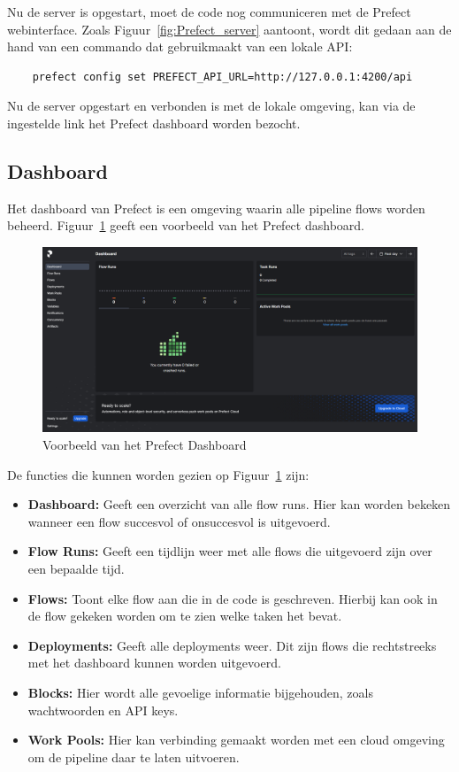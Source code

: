 Nu de server is opgestart, moet de code nog communiceren met de Prefect webinterface. Zoals Figuur~\ref{fig:Prefect_server} aantoont, wordt dit gedaan aan de hand van een commando dat gebruikmaakt van een lokale API:

\begin{verbatim}
    prefect config set PREFECT_API_URL=http://127.0.0.1:4200/api
\end{verbatim}

Nu de server opgestart en verbonden is met de lokale omgeving, kan via de ingestelde link het Prefect dashboard worden bezocht.

\subsection{Dashboard}

Het dashboard van Prefect is een omgeving waarin alle pipeline flows worden beheerd. Figuur~\ref{fig:Prefect_Dashboard} geeft een voorbeeld van het Prefect dashboard.

\begin{figure}[h]
    \centering
    \includegraphics[width=0.9\linewidth]{graphics/Prefect_dashboard.PNG}
    \caption{Voorbeeld van het Prefect Dashboard}
    \label{fig:Prefect_Dashboard}
\end{figure}

De functies die kunnen worden gezien op Figuur~\ref{fig:Prefect_Dashboard} zijn:

\begin{itemize}
    \item \textbf{Dashboard:} Geeft een overzicht van alle flow runs. Hier kan worden bekeken wanneer een flow succesvol of onsuccesvol is uitgevoerd.
    \item \textbf{Flow Runs:} Geeft een tijdlijn weer met alle flows die uitgevoerd zijn over een bepaalde tijd.
    \item \textbf{Flows:} Toont elke flow aan die in de code is geschreven. Hierbij kan ook in de flow gekeken worden om te zien welke taken het bevat.
    \item \textbf{Deployments:} Geeft alle deployments weer. Dit zijn flows die rechtstreeks met het dashboard kunnen worden uitgevoerd.
    \item \textbf{Blocks:} Hier wordt alle gevoelige informatie bijgehouden, zoals wachtwoorden en API keys.
    \item \textbf{Work Pools:} Hier kan verbinding gemaakt worden met een cloud omgeving om de pipeline daar te laten uitvoeren.
\end{itemize}

